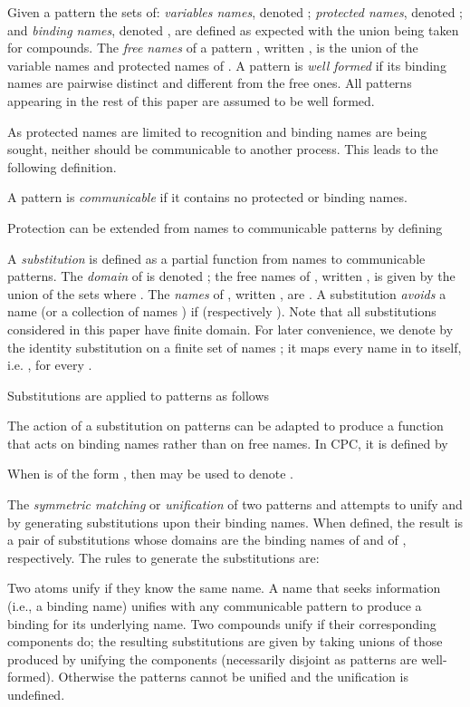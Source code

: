 \documentclass{LMCS}
\begin{document}
Given a pattern  the sets of: {\em variables names}, denoted ; {\em protected names}, denoted ; and {\em
  binding names}, denoted , are defined as expected with
the union being taken for compounds.  The {\em free names} of a
pattern , written , is the union of the variable names
and protected names of .  A pattern is {\em well formed} if its
binding names are pairwise distinct and different from the free ones.
All patterns appearing in the rest of this paper are assumed to be
well formed.

As protected names are limited to recognition and binding names are
being sought, neither should be communicable to another process.
This leads to the following definition.
\begin{defi}
\label{def:communicable}
A pattern is {\em communicable} if it contains no protected or binding names.
\end{defi}
Protection can be extended from names to communicable patterns by
defining


A {\em substitution}  is defined as a partial function from names to communicable patterns.
The {\em domain} of  is denoted ;
the free names of , written , is given by the union of the sets  where .
The {\em names} of , written , are .
A substitution  {\em avoids} a name  (or a collection of names ) if  (respectively ).
Note that all substitutions considered in this paper have finite domain.
For later convenience, we denote by  the identity
substitution on a finite set of names ; it maps every name in  to
itself, i.e.  , for every .


Substitutions are applied to patterns as follows

The action of a substitution
 on patterns can be adapted to produce a function 
that acts on binding names rather than on free names.  In CPC, it is
defined by

When  is of the form ,
then  may be used to denote .

The {\em symmetric matching} or {\em unification}  of
two patterns  and  attempts to unify  and  by generating
substitutions upon their binding names. When defined, the result is
a pair of substitutions whose domains are the binding names of 
and of , respectively. The rules to generate the substitutions are:

Two atoms unify if they know the same name. A name that seeks
information (i.e., a binding name) unifies with any communicable pattern to
produce a binding for its underlying name.  Two compounds unify if
their corresponding components do; the resulting substitutions are
given by taking unions of those produced by unifying the components 
(necessarily disjoint as patterns are well-formed).  Otherwise the
patterns cannot be unified and the unification is undefined.
\end{document}
